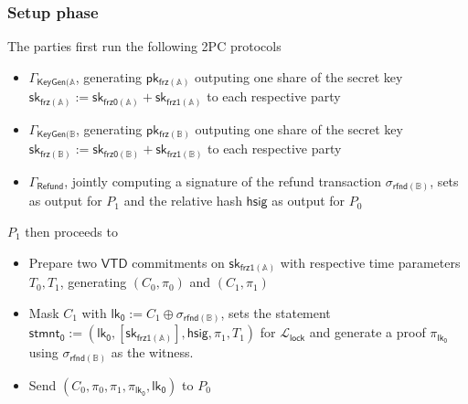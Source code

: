 \documentclass{article}      	%
\begin{document}
\subsubsection*{Setup phase}
The parties first run the following 2PC protocols 
\begin{itemize}
    \item  $\Gamma_{\mathsf{KeyGen(\mathbb{A}}}$, generating $\mathsf{pk_{frz(\mathbb{A})}}$ outputing one share of the secret key $\mathsf{sk_{frz(\mathbb{A})}} := \mathsf{sk_{frz0(\mathbb{A})}} + \mathsf{sk_{frz1(\mathbb{A})}}$ to each respective party 
    \item  $\Gamma_{\mathsf{KeyGen(\mathbb{B}}}$, generating $\mathsf{pk_{frz(\mathbb{B})}}$ outputing one share of the secret key $\mathsf{sk_{frz(\mathbb{B})}} := \mathsf{sk_{frz0(\mathbb{B})}} + \mathsf{sk_{frz1(\mathbb{B})}}$ to each respective party
    \item  $\Gamma_{\mathsf{Refund}}$, jointly computing a signature of the refund transaction $\sigma_{\mathsf{rfnd(\mathbb{B})}}$, sets as output for $P_1$ and the relative hash $\mathsf{hsig}$ as output for $P_0$
\end{itemize}

$P_1$ then proceeds to
\begin{itemize}
\item Prepare two $\mathsf{VTD}$ commitments on $\mathsf{sk_{frz1(\mathbb{A})}}$ with respective time parameters $T_0, T_1$, generating $(C_0, \pi_0)$ and $(C_1, \pi_1)$
\item Mask $C_1$ with  $\mathsf{lk_0} := C_1 \oplus \sigma_{\mathsf{rfnd(\mathbb{B})}}$, sets the statement $\mathsf{stmnt_0} := (\mathsf{lk_0}, {[\mathsf{sk_{frz1(\mathbb{A})}}]}, \mathsf{hsig}, \pi_1, T_1)$ for $\mathcal{L}_{\mathsf{lock}}$ and generate a proof $\pi_{\mathsf{lk_0}}$ using $\sigma_{\mathsf{rfnd(\mathbb{B})}}$ as the witness.
\item Send $(C_0, \pi_0, \pi_1, \pi_{\mathsf{lk_0}}, \mathsf{lk_0})$ to $P_0$ 
\end{itemize}
\vspace{0.1cm}
\end{document}

